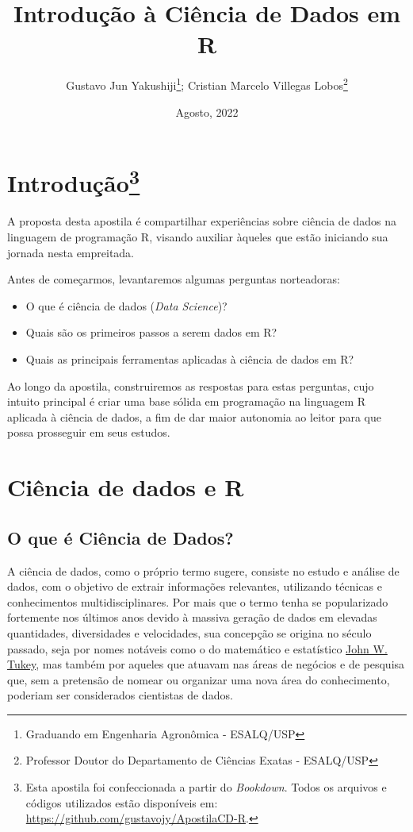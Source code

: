 \documentclass[
  brazilian,
]{book}
\title{Introdução à Ciência de Dados em R}
\author{Gustavo Jun Yakushiji\footnote{Graduando em Engenharia Agronômica - ESALQ/USP}; Cristian Marcelo Villegas Lobos\footnote{Professor Doutor do Departamento de Ciências Exatas - ESALQ/USP}}
\date{Agosto, 2022}
\begin{document}
\maketitle

{
\hypersetup{linkcolor=}
\setcounter{tocdepth}{1}
\tableofcontents
}
\hypertarget{introduuxe7uxe3o}{%
\chapter[Introdução]{\texorpdfstring{Introdução\footnote{Esta apostila foi confeccionada a partir do \emph{Bookdown}. Todos os arquivos e códigos utilizados estão disponíveis em: \url{https://github.com/gustavojy/ApostilaCD-R}.}}{Introdução}}\label{introduuxe7uxe3o}}

A proposta desta apostila é compartilhar experiências sobre ciência de dados na linguagem de programação R, visando auxiliar àqueles que estão iniciando sua jornada nesta empreitada.

Antes de começarmos, levantaremos algumas perguntas norteadoras:

\begin{itemize}
\item
  O que é ciência de dados (\emph{Data Science})?
\item
  Quais são os primeiros passos a serem dados em R?
\item
  Quais as principais ferramentas aplicadas à ciência de dados em R?
\end{itemize}

Ao longo da apostila, construiremos as respostas para estas perguntas, cujo intuito principal é criar uma base sólida em programação na linguagem R aplicada à ciência de dados, a fim de dar maior autonomia ao leitor para que possa prosseguir em seus estudos.

\hypertarget{ciuxeancia-de-dados-e-r}{%
\chapter{Ciência de dados e R}\label{ciuxeancia-de-dados-e-r}}

\hypertarget{o-que-uxe9-ciuxeancia-de-dados}{%
\section{O que é Ciência de Dados?}\label{o-que-uxe9-ciuxeancia-de-dados}}

A ciência de dados, como o próprio termo sugere, consiste no estudo e análise de dados, com o objetivo de extrair informações relevantes, utilizando técnicas e conhecimentos multidisciplinares. Por mais que o termo tenha se popularizado fortemente nos últimos anos devido à massiva geração de dados em elevadas quantidades, diversidades e velocidades, sua concepção se origina no século passado, seja por nomes notáveis como o do matemático e estatístico \href{http://www.ru.ac.bd/wp-content/uploads/sites/25/2019/03/102_05_01_Tukey-Exploratory-Data-Analysis-1977.pdf}{John W. Tukey}, mas também por aqueles que atuavam nas áreas de negócios e de pesquisa que, sem a pretensão de nomear ou organizar uma nova área do conhecimento, poderiam ser considerados cientistas de dados.
\end{document}
